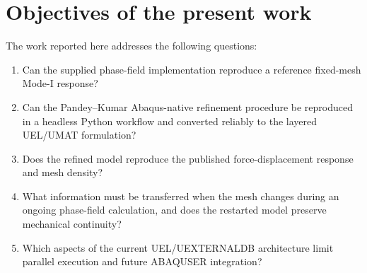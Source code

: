 \section{Objectives of the present work}
The work reported here addresses the following questions:
\begin{enumerate}
  \item Can the supplied phase-field implementation reproduce a reference fixed-mesh Mode-I response?
  \item Can the Pandey--Kumar Abaqus-native refinement procedure be reproduced in a headless Python workflow and converted reliably to the layered UEL/UMAT formulation?
  \item Does the refined model reproduce the published force-displacement response and mesh density?
  \item What information must be transferred when the mesh changes during an ongoing phase-field calculation, and does the restarted model preserve mechanical continuity?
  \item Which aspects of the current UEL/UEXTERNALDB architecture limit parallel execution and future ABAQUSER integration?
\end{enumerate}
